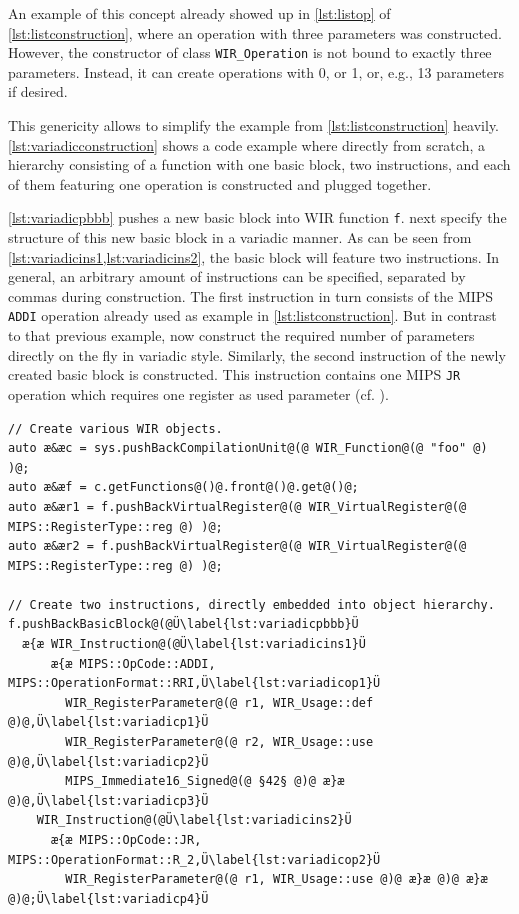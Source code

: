 An example of this concept already showed up in \cref{lst:listop} of \cref{lst:listconstruction}, where an operation with three parameters was constructed.
However, the constructor of class \texttt{WIR\_Operation} is not bound to exactly three parameters.
Instead, it can create operations with 0, or 1, or, e.g., 13 parameters if desired.

This genericity allows to simplify the example from \cref{lst:listconstruction} heavily.
\cref{lst:variadicconstruction} shows a code example where directly from scratch, a hierarchy consisting of a function with one basic block, two instructions, and each of them featuring one operation is constructed and plugged together.

\cref{lst:variadicpbbb} pushes a new basic block into \gls{WIR} function \texttt{f}.
 next specify the structure of this new basic block in a variadic manner.
As can be seen from \cref{lst:variadicins1,lst:variadicins2}, the basic block will feature two instructions.
In general, an arbitrary amount of instructions can be specified, separated by commas during construction.
The first instruction in turn consists of the MIPS \texttt{ADDI} operation already used as example in \cref{lst:listconstruction}.
But in contrast to that previous example,  now construct the required number of parameters directly on the fly in variadic style.
Similarly, the second instruction of the newly created basic block is constructed.
This instruction contains one MIPS \texttt{JR} operation which requires one register as used parameter (cf. ).

\begin{lstlisting}[style=code,float=t,caption={Variadic Construction of Object Hierarchies},label=lst:variadicconstruction]
// Create various WIR objects.
auto æ&æc = sys.pushBackCompilationUnit@(@ WIR_Function@(@ "foo" @) )@;
auto æ&æf = c.getFunctions@()@.front@()@.get@()@;
auto æ&ær1 = f.pushBackVirtualRegister@(@ WIR_VirtualRegister@(@ MIPS::RegisterType::reg @) )@;
auto æ&ær2 = f.pushBackVirtualRegister@(@ WIR_VirtualRegister@(@ MIPS::RegisterType::reg @) )@;

// Create two instructions, directly embedded into object hierarchy.
f.pushBackBasicBlock@(@Ü\label{lst:variadicpbbb}Ü
  æ{æ WIR_Instruction@(@Ü\label{lst:variadicins1}Ü
      æ{æ MIPS::OpCode::ADDI, MIPS::OperationFormat::RRI,Ü\label{lst:variadicop1}Ü
        WIR_RegisterParameter@(@ r1, WIR_Usage::def @)@,Ü\label{lst:variadicp1}Ü
        WIR_RegisterParameter@(@ r2, WIR_Usage::use @)@,Ü\label{lst:variadicp2}Ü
        MIPS_Immediate16_Signed@(@ §42§ @)@ æ}æ @)@,Ü\label{lst:variadicp3}Ü
    WIR_Instruction@(@Ü\label{lst:variadicins2}Ü
      æ{æ MIPS::OpCode::JR, MIPS::OperationFormat::R_2,Ü\label{lst:variadicop2}Ü
        WIR_RegisterParameter@(@ r1, WIR_Usage::use @)@ æ}æ @)@ æ}æ @)@;Ü\label{lst:variadicp4}Ü
\end{lstlisting}

